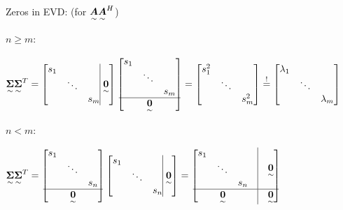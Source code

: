 \ \\

Zeros in EVD: (for $\underset{\sim}{\boldsymbol {A}}\underset{\sim}{\boldsymbol {A}}^H$)


 $n\geq m$:

$\ma{\Sigma}\ma{\Sigma}^T=
\begin{bmatrix}\begin{matrix}s_1 & & \\ &\ddots& \\ & & s_m  \end{matrix}\vline \;\ma{0} \end{bmatrix}
\begin{bmatrix}\begin{matrix}s_1 & & \\ &\ddots& \\ & & s_m  \end{matrix}\\\hline\ma{0} \end{bmatrix}  
=\begin{bmatrix}s_1^2 & & \\ &\ddots& \\ & & s_m^2  \end{bmatrix}\overset{!}{=}
\begin{bmatrix}\lambda_1 & & \\ &\ddots& \\ & & \lambda_m  \end{bmatrix}$

 $n< m$:

$\ma{\Sigma}\ma{\Sigma}^T=
\begin{bmatrix}\begin{matrix}s_1 & & \\ &\ddots& \\ & & s_n  \end{matrix}\\\hline\ma{0} \end{bmatrix}
\begin{bmatrix}\begin{matrix}s_1 & & \\ &\ddots& \\ & & s_n  \end{matrix}\vline \;\ma{0} \end{bmatrix}
=\begin{bmatrix}\begin{matrix}s_1 & & \\ &\ddots& \\ & & s_n  \end{matrix}&\vline&\ma{0}\\ \hline \ma{0}&\vline&\ma{0} \end{bmatrix}$



